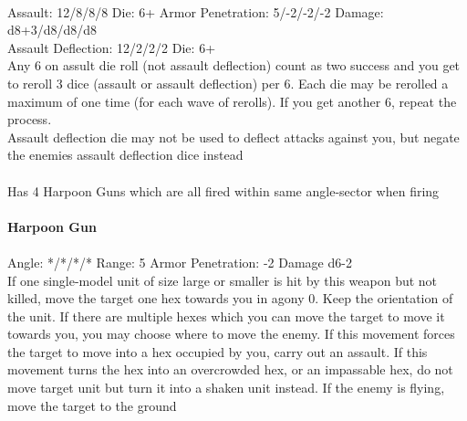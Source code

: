 \ \\
Assault: 12/8/8/8 Die: 6+ Armor Penetration: 5/-2/-2/-2 Damage: d8+3/d8/d8/d8 \\
Assault Deflection: 12/2/2/2 Die: 6+\\
\indent Any 6 on assult die roll (not assault deflection) count as two success and you get to reroll 3 dice (assault or assault deflection) per 6. Each die may be rerolled a maximum of one time (for each wave of rerolls). If you get another 6, repeat the process. \\ Assault deflection die may not be used to deflect attacks against you, but negate the enemies assault deflection dice instead \\
\ \\
Has 4 Harpoon Guns which are all fired within same angle-sector when firing
\ \\
\ \\
{\bf Harpoon Gun } \\
\ \\
Angle: */*/*/* Range: 5 Armor Penetration: -2 Damage d6-2 \\
\indent If one single-model unit of size large or smaller is hit by this weapon but not killed, move the target one hex towards you in agony 0. Keep the orientation of the unit. If there are multiple hexes which you can move the target to move it towards you, you may choose where to move the enemy. If this movement forces the target to move into a hex occupied by you, carry out an assault. If this movement turns the hex into an overcrowded hex, or an impassable hex, do not move target unit but turn it into a shaken unit instead. If the enemy is flying, move the target to the ground \\





